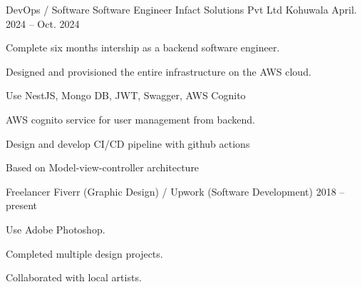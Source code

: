 

\begin{cventries}

  \cventry
    {DevOps / Software Software Engineer} %
    {Infact Solutions Pvt Ltd} %
    {Kohuwala} %
    {April. 2024 -- Oct. 2024} %

    {
      \begin{cvitems} %
        \item {Complete six months intership as a backend software engineer.}
        \item {Designed and provisioned the entire infrastructure on the AWS cloud.}
        \item {Use NestJS, Mongo DB, JWT, Swagger, AWS Cognito}
        \item {AWS cognito service for user management from backend.}
        \item {Design and develop CI/CD pipeline with github actions}
        \item {Based on Model-view-controller architecture}
      \end{cvitems}
    }

  \cventry
    {Freelancer} %
    {Fiverr (Graphic Design) / Upwork (Software Development)} %
    {} %
    {2018 -- present} %
    {
      \begin{cvitems} %
        \item {Use Adobe Photoshop.}
        \item {Completed multiple design projects.}
        \item {Collaborated with local artists.}
      \end{cvitems}
    }

\end{cventries}
